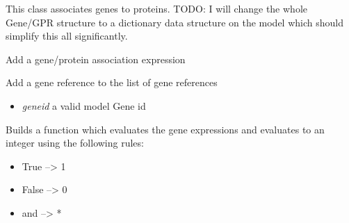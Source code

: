 \documentclass[a4paper,11pt,english]{sphinxmanual}
\begin{document}

\begin{fulllineitems}
\label{modules_doc:cbmpy.CBModel.GeneProteinAssociation}
This class associates genes to proteins.
TODO: I will change the whole Gene/GPR structure to a dictionary data structure on the model which should simplify this all significantly.

\begin{fulllineitems}
\label{modules_doc:cbmpy.CBModel.GeneProteinAssociation.addAssociation}
Add a gene/protein association expression

\end{fulllineitems}


\begin{fulllineitems}
\label{modules_doc:cbmpy.CBModel.GeneProteinAssociation.addGeneref}
Add a gene reference to the list of gene references
\begin{itemize}
\item {} 
\emph{geneid} a valid model Gene id

\end{itemize}

\end{fulllineitems}


\begin{fulllineitems}
\label{modules_doc:cbmpy.CBModel.GeneProteinAssociation.buildEvalFunc}
Builds a function which evaluates the gene expressions and evaluates to an integer using
the following rules:
\begin{itemize}
\item {} 
True --\textgreater{} 1

\item {} 
False --\textgreater{} 0

\item {} 
and --\textgreater{} *


\end{itemize}
\end{fulllineitems}
\end{fulllineitems}
\end{document}
